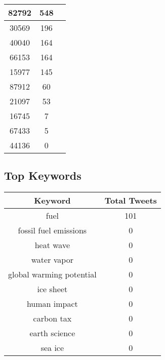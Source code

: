 \documentclass{article}\usepackage[T1]{fontenc}
\begin{document}
\begin{tabular}{|c|c|c|}
 \hline
82792 & 548\\ 
 \hline
30569 & 196\\ 
 \hline
40040 & 164\\ 
 \hline
66153 & 164\\ 
 \hline
15977 & 145\\ 
 \hline
87912 & 60\\ 
 \hline
21097 & 53\\ 
 \hline
16745 & 7\\ 
 \hline
67433 & 5\\ 
 \hline
44136 & 0\\ 
 \hline
\end{tabular}\subsection*{Top Keywords}\begin{tabular}{|c|c|}         \hline         Keyword & Total Tweets \\ 
 \hline
fuel & 101\\ 
 \hline
fossil fuel emissions & 0\\ 
 \hline
heat wave & 0\\ 
 \hline
water vapor & 0\\ 
 \hline
global warming potential & 0\\ 
 \hline
ice sheet & 0\\ 
 \hline
human impact & 0\\ 
 \hline
carbon tax & 0\\ 
 \hline
earth science & 0\\ 
 \hline
sea ice & 0\\ 
 \hline
\end{tabular}
\end{document}
